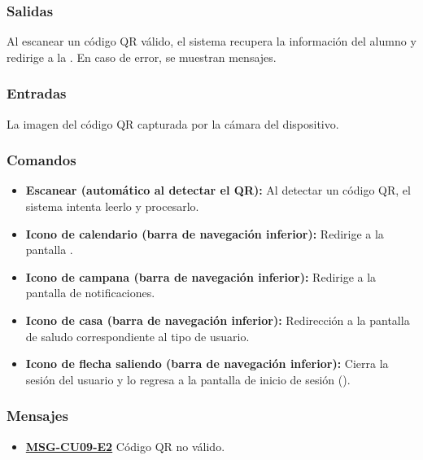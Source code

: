 \subsubsection{Salidas}
Al escanear un código QR válido, el sistema recupera la información del alumno y redirige a la . En caso de error, se muestran mensajes.

\subsubsection{Entradas}
La imagen del código QR capturada por la cámara del dispositivo.

\subsubsection{Comandos}
\begin{itemize}
	\item \textbf{Escanear (automático al detectar el QR):} Al detectar un código QR, el sistema intenta leerlo y procesarlo.
	\item \textbf{Icono de calendario (barra de navegación inferior):} Redirige a la pantalla .
	\item \textbf{Icono de campana (barra de navegación inferior):} Redirige a la pantalla de notificaciones.
	\item \textbf{Icono de casa (barra de navegación inferior):} Redirección a la pantalla de saludo correspondiente al tipo de usuario.
	\item \textbf{Icono de flecha saliendo (barra de navegación inferior):} Cierra la sesión del usuario y lo regresa a la pantalla de inicio de sesión ().
\end{itemize}

\subsubsection{Mensajes}
\begin{itemize}
	\item \textbf{\hyperref[msg:CU09-E2]{MSG-CU09-E2}} Código QR no válido.
\end{itemize}


